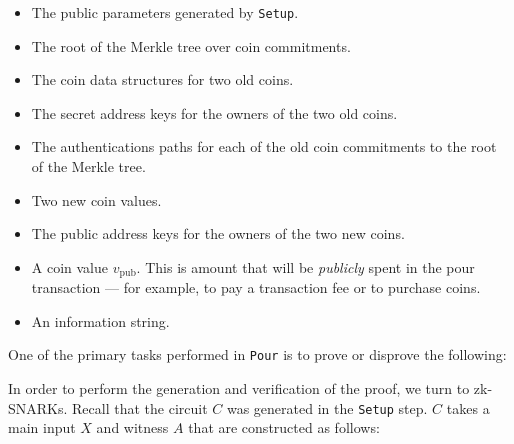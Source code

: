 \documentclass{article}
\begin{document}
\begin{itemize}
\item The public parameters generated by \texttt{Setup}.
\item The root of the Merkle tree over coin commitments.
\item The coin data structures for two old coins.
\item The secret address keys for the owners of the two old coins.
\item The authentications paths for each of the old coin commitments to the root of the Merkle tree.
\item Two new coin values.
\item The public address keys for the owners of the two new coins.
\item A coin value $v_\text{pub}$. This is amount that will be \emph{publicly} spent in the pour transaction --- for example, to pay a transaction fee or to purchase coins.
\item An information string.
\end{itemize}

One of the primary tasks performed in \texttt{Pour} is to prove or disprove the following: \newline

\medskip

In order to perform the generation and verification of the proof, we turn to zk-SNARKs. Recall that the circuit $C$ was generated in the \texttt{Setup} step. $C$ takes a main input $X$ and witness $A$ that are constructed as follows:
\end{document}
